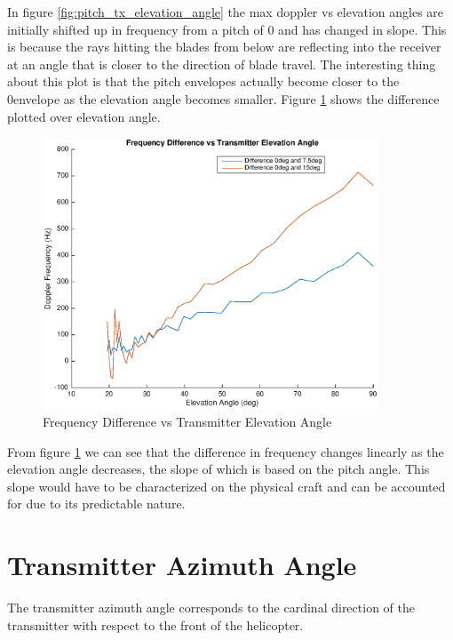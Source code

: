 In figure \ref{fig:pitch_tx_elevation_angle} the max doppler vs elevation angles are initially shifted up in frequency from a pitch of 0 and has changed in slope. This is because the rays hitting the blades from below are reflecting into the receiver at an angle that is closer to the direction of blade travel. The interesting thing about this plot is that the pitch envelopes actually become closer to the 0\textdegree \space envelope as the elevation angle becomes smaller. Figure \ref{fig:pitch_tx_elevation_angle_difference} shows the difference plotted over elevation angle.

\begin{figure}
	\begin{center}
		\includegraphics[width=10cm]{images/simulation/elevation_angle_with_pitch_max_doppler_Difference.eps}
		\caption{Frequency Difference vs Transmitter Elevation Angle}
		\label{fig:pitch_tx_elevation_angle_difference}
	\end{center}
\end{figure}

From figure \ref{fig:pitch_tx_elevation_angle_difference} we can see that the difference in frequency changes linearly as the elevation angle decreases, the slope of which is based on the pitch angle. This slope would have to be characterized on the physical craft and can be accounted for due to its predictable nature.

\section{Transmitter Azimuth Angle} \label{taa}
The transmitter azimuth angle corresponds to the cardinal direction of the transmitter with respect to the front of the helicopter.


